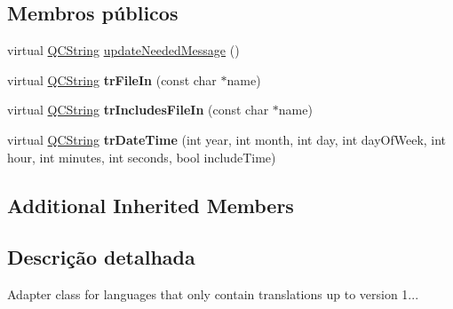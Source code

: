 \subsection*{Membros públicos}
\begin{DoxyCompactItemize}
\item 
virtual \hyperlink{class_q_c_string}{Q\-C\-String} \hyperlink{class_translator_adapter__1__6__3_aa2c053398a494e36caf5152d9a4fc6cf}{update\-Needed\-Message} ()
\item 
\hypertarget{class_translator_adapter__1__6__3_acf964d17bad4c55c393193fe9708575f}{virtual \hyperlink{class_q_c_string}{Q\-C\-String} {\bfseries tr\-File\-In} (const char $\ast$name)}\label{class_translator_adapter__1__6__3_acf964d17bad4c55c393193fe9708575f}

\item 
\hypertarget{class_translator_adapter__1__6__3_a53f57c6e2aa0b9dc09bc47b3746d3481}{virtual \hyperlink{class_q_c_string}{Q\-C\-String} {\bfseries tr\-Includes\-File\-In} (const char $\ast$name)}\label{class_translator_adapter__1__6__3_a53f57c6e2aa0b9dc09bc47b3746d3481}

\item 
\hypertarget{class_translator_adapter__1__6__3_a19c43671f677ae0445fca1fe7a5f62cc}{virtual \hyperlink{class_q_c_string}{Q\-C\-String} {\bfseries tr\-Date\-Time} (int year, int month, int day, int day\-Of\-Week, int hour, int minutes, int seconds, bool include\-Time)}\label{class_translator_adapter__1__6__3_a19c43671f677ae0445fca1fe7a5f62cc}

\end{DoxyCompactItemize}
\subsection*{Additional Inherited Members}


\subsection{Descrição detalhada}
Adapter class for languages that only contain translations up to version 1... 

